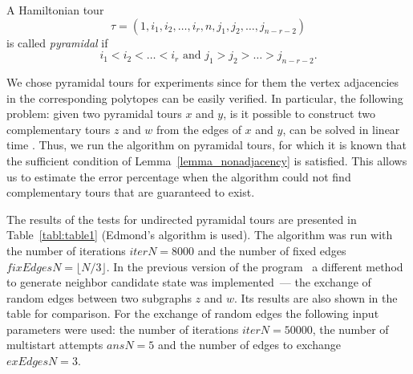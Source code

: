 \documentclass[runningheads]{llncs}
\begin{document}
A Hamiltonian tour %
\[\tau = (1, i_1, i_2, \ldots, i_r, n, j_1, j_2, \ldots, j_{n-r-2})\] 
is called \textit{pyramidal} if %
\[i_1 < i_2 < \ldots < i_r \text{ and } j_1 > j_2 > \ldots > j_{n-r-2}.\]

We chose pyramidal tours for experiments since for them the vertex adjacencies in the corresponding polytopes can be easily verified.
In particular, the following problem: given two pyramidal tours $x$ and $y$, is it possible to construct two complementary tours $z$ and $w$ from the edges of $x$ and $y$, can be solved in linear time \cite{Bondarenko-Nikolaev-2017,Bondarenko-Nikolaev-2018}.
Thus, we run the algorithm on pyramidal tours, for which it is known that the sufficient condition of Lemma~\ref{lemma_nonadjacency} is satisfied.
This allows us to estimate the error percentage when the algorithm could not find complementary tours that are guaranteed to exist. %

The results of the tests for undirected pyramidal tours are presented in Table~\ref{tabl:table1} (Edmond's algorithm is used). %
The algorithm was run with the number of iterations $iterN = 8000$ and the number of fixed edges $fixEdgesN = \lfloor N/3 \rfloor$. %
In the previous version of the program~\cite{Kozlova} a different method to generate neighbor candidate state was implemented~--- the exchange of random edges between two subgraphs $z$ and $w$. Its results are also shown in the table for comparison. For the exchange of random edges the following input parameters were used: the number of iterations $iterN = 50000$, the number of multistart attempts $ansN = 5$ and the number of edges to exchange $exEdgesN = 3$. %
\end{document}
